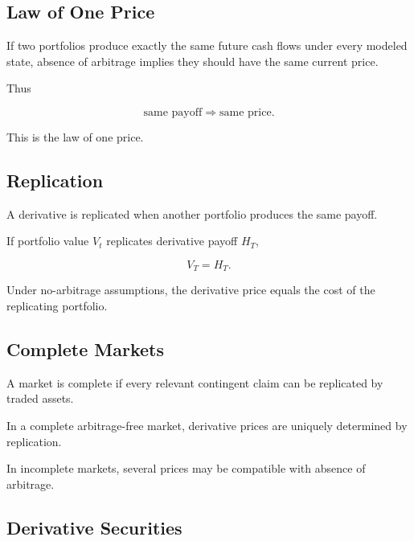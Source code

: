 \subsection{Law of One Price}
\label{subsec:law-of-one-price}

If two portfolios produce exactly the same future cash flows under every
modeled state, absence of arbitrage implies they should have the same current
price.

Thus

\[
\boxed{
\text{same payoff}
\Rightarrow
\text{same price}.
}
\]

This is the law of one price.

\subsection{Replication}
\label{subsec:financial-replication}

A derivative is replicated when another portfolio produces the same payoff.

If portfolio value \(V_t\) replicates derivative payoff \(H_T\),

\[
\boxed{
V_T=H_T.
}
\]

Under no-arbitrage assumptions, the derivative price equals the cost of the
replicating portfolio.

\subsection{Complete Markets}
\label{subsec:complete-markets}

A market is complete if every relevant contingent claim can be replicated by
traded assets.

In a complete arbitrage-free market, derivative prices are uniquely
determined by replication.

In incomplete markets, several prices may be compatible with absence of
arbitrage.

\subsection{Derivative Securities}
\label{subsec:derivative-securities}

